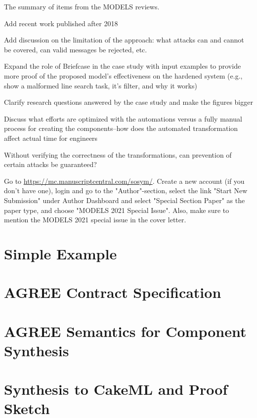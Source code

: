 \documentclass[global,twocolumn]{svjour}
\begin{document}
\noindent The summary of items from the MODELS reviews.
\begin{compactitem}
  \item Add recent work published after 2018
  \item Add discussion on the limitation of the approach: what attacks can and cannot be covered, can valid messages be rejected, etc.
  \item Expand the role of Briefcase in the case study with input examples to provide more proof of the proposed model's effectiveness on the hardened system (e.g., show a malformed line search task, it's filter, and why it works) 
  \item Clarify research questions answered by the case study and make the figures bigger
  \item Discuss what efforts are optimized with the automations versus a fully manual process for creating the components--how does the automated transformation affect actual time for engineers
  \item Without verifying the correctness of the transformations, can prevention of certain attacks be guaranteed?
\end{compactitem}
\noindent Go to \url{https://mc.manuscriptcentral.com/sosym/}. Create a new account (if you don't have one), login and go to the "Author"-section, select the link "Start New Submission" under Author Dashboard and select "Special Section Paper" as the paper type, and choose "MODELS 2021 Special Issue". Also, make sure to mention the MODELS 2021 special issue in the cover letter.

\section{Simple Example} \label{sec:example}


\section{AGREE Contract Specification} \label{sec:agree}


\section{AGREE Semantics for Component Synthesis}


\section{Synthesis to CakeML and Proof Sketch} \label{sec:synthesis}

\end{document}
